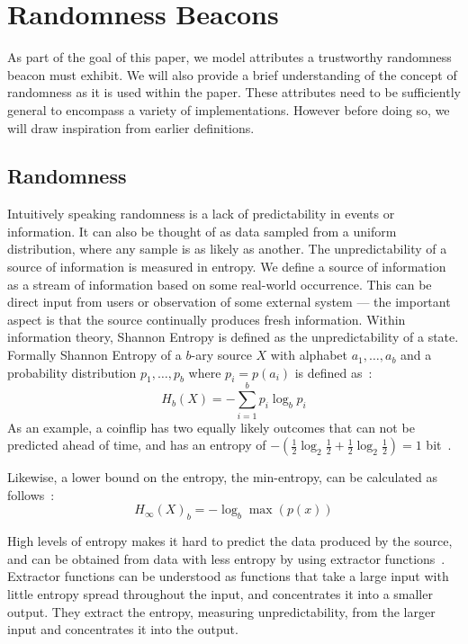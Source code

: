 \section{Randomness Beacons}\label{sec:beacons}

As part of the goal of this paper, we model attributes a trustworthy randomness beacon must exhibit.
We will also provide a brief understanding of the concept of randomness as it is used within the paper.
These attributes need to be sufficiently general to encompass a variety of implementations.
However before doing so, we will draw inspiration from earlier definitions.

\subsection{Randomness}\label{sub:beacons_randomness}

Intuitively speaking randomness is a lack of predictability in events or information. It can also be thought of as data sampled from a uniform distribution, where any sample is as likely as another. The unpredictability of a source of information is measured in entropy.
We define a source of information as a stream of information based on some real-world occurrence. This can be direct input from users or observation of some external system --- the important aspect is that the source continually  produces fresh information.
Within information theory, Shannon Entropy is defined as the unpredictability of a state.
Formally Shannon Entropy of a $b$-ary source $X$ with alphabet ${a_1, \ldots, a_b}$ and a probability distribution ${p_1, \ldots , p_b}$ where $p_i = p(a_i)$ is defined as~\cite{informationtheory}:
$$
H_{b} (X) = -\sum\limits_{i = 1}^b p_{i}\log_{b} p_{i}
$$
As an example, a coinflip has two equally likely outcomes that can not be predicted ahead of time, and has an entropy of $-(\frac{1}{2}\log_2 \frac{1}{2} + \frac{1}{2}\log_2 \frac{1}{2}) = 1$ bit~\cite{informationtheory}.

Likewise, a lower bound on the entropy, the  min-entropy, can be calculated as follows~\cite{informationtheory}:
$$H_\infty(X)_{b} = -\log_{b}\max(p(x))$$

High levels of entropy makes it hard to predict the data produced by the source, and can be obtained from data with less entropy by using extractor functions~\cite{pseudorandomness}. Extractor functions can be understood as functions that take a large input with little entropy spread throughout the input, and concentrates it into a smaller output. They extract the entropy, measuring unpredictability, from the larger input and concentrates it into the output.

